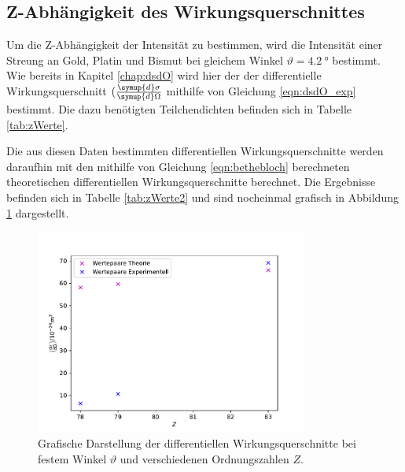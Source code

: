 \subsection{Z-Abhängigkeit des Wirkungsquerschnittes}
Um die Z-Abhängigkeit der Intensität zu bestimmen, wird die Intensität einer Streung an Gold, Platin und Bismut bei gleichem Winkel $\vartheta = \SI{4,2}{\degree} $ bestimmt. Wie bereits in Kapitel \ref{chap:dsdO} wird hier der der differentielle Wirkungsquerschnitt $(\frac{\symup{d}\sigma}{\symup{d}\Omega}$ mithilfe von Gleichung \ref{eqn:dsdO_exp} bestimmt.
Die dazu benötigten Teilchendichten befinden sich in Tabelle \ref{tab:zWerte}.

Die aus diesen Daten bestimmten differentiellen Wirkungsquerschnitte werden daraufhin mit den mithilfe von Gleichung \eqref{eqn:bethebloch} berechneten theoretischen differentiellen Wirkungsquerschnitte berechnet.
Die Ergebnisse befinden sich in Tabelle \ref{tab:zWerte2} und sind nocheinmal grafisch in Abbildung \ref{fig:zWerte2} dargestellt.

\begin{figure}
    \centering
    \includegraphics[width = 0.8\textwidth]{data/plots/atomic_number.pdf}
    \caption{Grafische Darstellung der differentiellen Wirkungsquerschnitte bei festem Winkel $\vartheta$ und verschiedenen Ordnungszahlen $Z$.}
    \label{fig:zWerte2}
\end{figure}

\FloatBarrier
